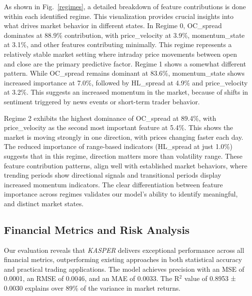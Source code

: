 \documentclass[conference,10pt]{IEEEtran}
\begin{document}
As shown in Fig.~\ref{regimes}, a detailed breakdown of feature contributions is done within each identified regime. This visualization provides crucial insights into what drives market behavior in different states.
In Regime 0, OC\_spread dominates at 88.9\% contribution, with price\_velocity at 3.9\%, momentum\_state at 3.1\%, and other features contributing minimally. This regime represents a relatively stable market setting where intraday price movements between open and close are the primary predictive factor.
Regime 1 shows a somewhat different pattern. While OC\_spread remains dominant at 83.6\%, momentum\_state shows increased importance at 7.0\%, followed by HL\_spread at 4.9\% and price\_velocity at 3.2\%. This suggests an increased momentum in the market, because of shifts in sentiment triggered by news events or short-term trader behavior.

Regime 2 exhibits the highest dominance of OC\_spread at 89.4\%, with price\_velocity as the second most important feature at 5.4\%. This shows the market is moving strongly in one direction, with prices changing faster each day. The reduced importance of range-based indicators (HL\_spread at just 1.0\%) suggests that in this regime, direction matters more than volatility range.
These feature contribution patterns, align well with established market behaviors, where trending periods show directional signals and transitional periods display increased momentum indicators. The clear differentiation between feature importance across regimes validates our model's ability to identify meaningful, and distinct market states.


\subsection{Financial Metrics and Risk Analysis} 

Our evaluation reveals that \textit{KASPER} delivers exceptional performance across all financial metrics,  outperforming existing approaches in both statistical accuracy and practical trading applications. The model achieves precision with an MSE of 0.0001, an RMSE of 0.0046, and an MAE of 0.0033. The R$^2$ value of 0.8953 ± 0.0030 explains over 89\% of the variance in market returns.
\end{document}

